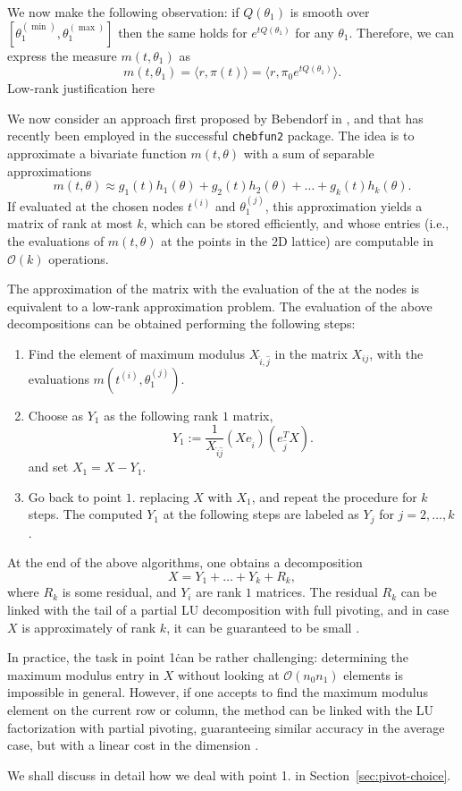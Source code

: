 \documentclass[]{article}
\begin{document}
We now make the following observation: if 
$Q(\theta_1)$ is smooth over $[\theta_1^{(\min)}, \theta_1^{(\max)}]$
then the same holds for $e^{tQ(\theta_1)}$ for any 
$\theta_1$. Therefore, we can express the measure 
$m(t, \theta_1)$ as 
\[
    m(t, \theta_1) = \langle r, \pi(t) \rangle = 
      \langle r, \pi_0 e^{tQ(\theta_1)} \rangle. 
\]
{ \color{red} Low-rank justification here }

We now consider an approach first proposed by Bebendorf 
in \cite{bebendorf2003adaptive}, and that has recently been employed in 
the successful \texttt{chebfun2} package. The idea is 
to approximate a bivariate function $m(t, \theta)$ with a 
sum of separable approximations
\[
    m(t, \theta) \approx 
      g_1(t) h_1(\theta) + g_2(t) h_2(\theta) + \ldots 
      + g_k(t) h_k(\theta). 
\]
If evaluated at the chosen nodes $t^{(i)}$ and 
$\theta_1^{(j)}$, this approximation yields a matrix 
of rank at most $k$, which can be stored efficiently, and 
whose entries (i.e., the evaluations of $m(t,\theta)$ at the 
points in the 2D lattice) are computable in $\mathcal O(k)$ 
operations. 

The approximation of the matrix with the  evaluation of the  
at the nodes is equivalent to a low-rank approximation 
problem. The evaluation of the above decompositions 
can be obtained performing the following 
steps:
\begin{enumerate}
    \item Find the element of maximum modulus  $X_{\hat i, \hat j}$
      in the matrix 
      $X_{ij}$, with the evaluations 
      $m(t^{(i)}, \theta_1^{(j)})$. 
    \item Choose as $Y_1$ as the following rank $1$ matrix,
      \[
          Y_1 := \frac{1}{X_{\hat i \hat j}} 
            (X e_{\hat i}) (e_{\hat j}^T X).
      \]
      and set $X_1 = X - Y_1$. 
    \item Go back to point $1.$ replacing $X$ with $X_1$, and repeat 
      the procedure for $k$ steps. The computed $Y_1$ at the following 
      steps are labeled as $Y_j$ for $j = 2, \ldots, k$. 
\end{enumerate}

At the end of the above algorithms, one obtains a decomposition 
\[
    X = Y_1 + \ldots + Y_k + R_k, 
\]
where $R_k$ is some residual, and $Y_i$ are rank $1$ matrices. The 
residual $R_k$ can be linked with the tail of a partial LU decomposition 
with full pivoting, and in case $X$ is approximately of rank $k$, 
it can be guaranteed to be small \cite{bebendorf2003adaptive,townsend2013extension}. 

In practice, the task in point 1\. can be rather challenging: determining the
maximum modulus entry in $X$ without looking at $\mathcal O(n_0 n_1)$ 
elements is impossible in general. However, if one 
accepts to find the maximum modulus element on the current row 
or column, the method can be linked with the LU factorization 
with partial pivoting, guaranteeing similar accuracy 
in the average case, but with a linear cost in the dimension \cite{bebendorf2003adaptive}. 

We shall discuss in detail how we deal with
point 1. in Section~\ref{sec:pivot-choice}. 



\end{document}

